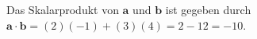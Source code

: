 Das Skalarprodukt von $\mathbf{a}$ und $\mathbf{b}$ ist gegeben durch $\mathbf{a} \cdot \mathbf{b} = (2)(-1) + (3)(4) = 2 - 12 = -10$.
